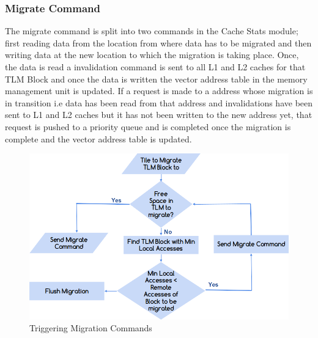 \documentclass{listhesis}
\begin{document}
\subsubsection{Migrate Command}
The migrate command is split into two commands in the Cache Stats module; first reading data from the location from where data has to be migrated and then writing data at the new location to which the migration is taking place. Once, the data is read a invalidation command is sent to all L1 and L2 caches for that TLM Block and once the data is written the vector address table in the memory management unit is updated. If a request is made to a address whose migration is in transition i.e data has been read from that address and invalidations have been sent to L1 and L2 caches but it has not been written to the new address yet, that request is pushed to a priority queue and is completed once the migration is complete and the vector address table is updated.\\
\begin{figure}
  \includegraphics[width=\linewidth]{tlmstats.png}
  \centering
  \caption{Triggering Migration Commands}
  \label{fig:tlm_stats flowchart}
\end{figure}
\end{document}
